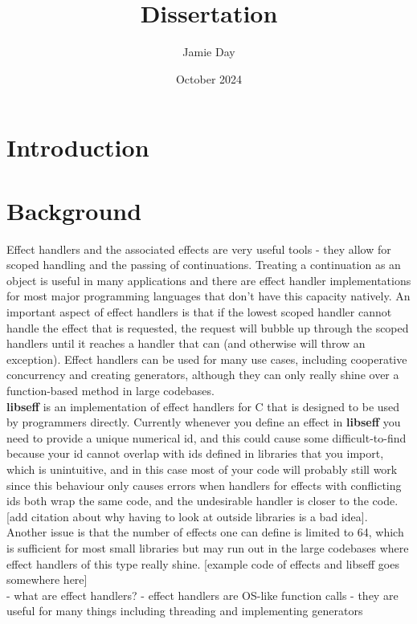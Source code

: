 \documentclass{article}
\title{Dissertation}
\author{Jamie Day}
\date{October 2024}
\begin{document}
\maketitle
\section{Introduction}
\section{Background}

Effect handlers and the associated effects are very useful tools - they allow for scoped handling and the passing of continuations. Treating a continuation as an object is useful in many applications and there are effect handler implementations for most major programming languages that don't have this capacity natively.\cite{libseff_paper} An important aspect of effect handlers is that if the lowest scoped handler cannot handle the effect that is requested, the request will bubble up through the scoped handlers until it reaches a handler that can (and otherwise will throw an exception). Effect handlers can be used for many use cases, including cooperative concurrency and creating generators, although they can only really shine over a function-based method in large codebases.
\\

\textbf{libseff} is an implementation of effect handlers for C that is designed to be used by programmers directly.\cite{libseff_paper} Currently whenever you define an effect in \textbf{libseff} you need to provide a unique numerical id, and this could cause some difficult-to-find because your id cannot overlap with ids defined in libraries that you import, which is unintuitive, and in this case most of your code will probably still work since this behaviour only causes errors when handlers for effects with conflicting ids both wrap the same code, and the undesirable handler is closer to the code. [add citation about why having to look at outside libraries is a bad idea]. Another issue is that the number of effects one can define is limited to 64, which is sufficient for most small libraries but may run out in the large codebases where effect handlers of this type really shine. [example code of effects and libseff goes somewhere here]
\\

 - what are effect handlers?
    - effect handlers are OS-like function calls
    - they are useful for many things including threading and implementing generators
\end{document}

